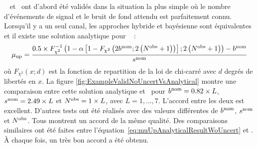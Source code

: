 \opthylic~
et \tifosi~ont d'abord \'et\'e valid\'es dans la situation la plus simple o\`u le nombre d'\'ev\'enements de signal et le bruit de fond attendu est parfaitement connu. 
Lorsqu'il y a un seul canal, les approches hybride et bay\'esienne sont \'equivalentes et il existe une solution analytique pour \mup~\cite{Busato:2015ola} :
\begin{equation}
\label{eq:muUpAnalyticalResultWoUncert}
\mu_{\text{up}}=\frac{0.5\times F_{\chi^{2}}^{-1}\left(1-\alpha\left[1-F_{\chi^{2}}\left(2b^{\text{nom}};2\left(N^{\text{obs}}+1\right)\right)\right];2\left(N^{\text{obs}}+1\right)\right)-b^{\text{nom}}}{s^{\text{nom}}}
\end{equation}
o\`u $F_{\chi^2}\left(x;d\right)$ est la fonction de repartition de la loi de chi-carr\'e avec $d$ degr\'es de libert\'es en $x$. 
La figure \ref{fig:ExampleValidNoUncertVsAnalytical} montre une comparaison entre cette solution analytique et \opthylic~pour $b^{\text{nom}}=0.82\times L$, $s^{\text{nom}}=2.49\times L$ et $N^{\text{obs}}=1\times L$, avec $L=1,\hdots,7$. 
L'accord entre les deux est excellent. 
D'autres tests ont \'et\'e r\'ealis\'es avec des valeurs diff\'erentes de $b^{\text{nom}}$, $s^{\text{nom}}$ et $N^{\text{obs}}$. 
Tous montrent un accord de la m\^eme qualit\'e.
Des comparaisons similaires ont \'et\'e faites entre l'\'equation~\ref{eq:muUpAnalyticalResultWoUncert} et \tifosi. 
\`A chaque fois, un tr\`es bon accord a \'et\'e obtenu.

